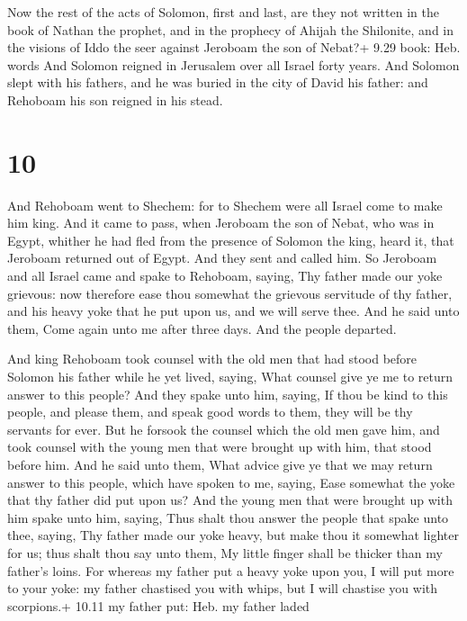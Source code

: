  Now the rest of the acts of Solomon, first and last, are
they not written in the book of Nathan the prophet, and in the prophecy
of Ahijah the Shilonite, and in the visions of Iddo the seer against
Jeroboam the son of Nebat?+ 9.29 book: Heb. words  And
Solomon reigned in Jerusalem over all Israel forty years. 
And Solomon slept with his fathers, and he was buried in the city of
David his father: and Rehoboam his son reigned in his stead.

\hypertarget{section-9}{%
\section{10}\label{section-9}}

 And Rehoboam went to Shechem: for to Shechem were all
Israel come to make him king.  And it came to pass, when
Jeroboam the son of Nebat, who was in Egypt, whither he had fled from
the presence of Solomon the king, heard it, that Jeroboam returned out
of Egypt.  And they sent and called him. So Jeroboam and all
Israel came and spake to Rehoboam, saying,  Thy father made
our yoke grievous: now therefore ease thou somewhat the grievous
servitude of thy father, and his heavy yoke that he put upon us, and we
will serve thee.  And he said unto them, Come again unto me
after three days. And the people departed.

 And king Rehoboam took counsel with the old men that had
stood before Solomon his father while he yet lived, saying, What counsel
give ye me to return answer to this people?  And they spake
unto him, saying, If thou be kind to this people, and please them, and
speak good words to them, they will be thy servants for ever.
 But he forsook the counsel which the old men gave him, and
took counsel with the young men that were brought up with him, that
stood before him.  And he said unto them, What advice give
ye that we may return answer to this people, which have spoken to me,
saying, Ease somewhat the yoke that thy father did put upon us?
 And the young men that were brought up with him spake unto
him, saying, Thus shalt thou answer the people that spake unto thee,
saying, Thy father made our yoke heavy, but make thou it somewhat
lighter for us; thus shalt thou say unto them, My little finger shall be
thicker than my father's loins.  For whereas my father put
a heavy yoke upon you, I will put more to your yoke: my father chastised
you with whips, but I will chastise you with scorpions.+ 10.11 my father
put: Heb. my father laded

